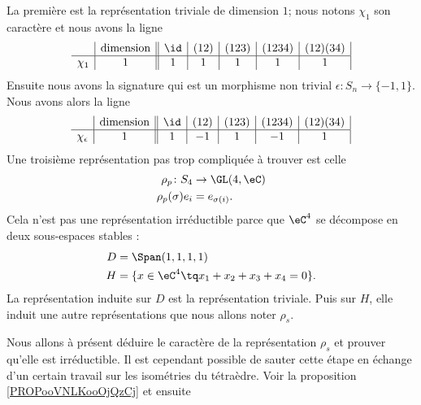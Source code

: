 La première est la représentation triviale de dimension \( 1\); nous notons \( \chi_1\) son caractère et nous avons la ligne
\begin{equation}
    \begin{array}[]{c|c||c|c|c|c|c|}
        &\text{dimension}&\id&(12)&(123)&(1234)&(12)(34)\\
          \hline
          \chi_1&1&1&1&1&1&1\\ 
    \end{array}
\end{equation}
Ensuite nous avons la signature qui est un morphisme non trivial \( \epsilon\colon S_n\to \{ -1,1 \}\). Nous avons alors la ligne
\begin{equation}    \label{EqGNRavtl}
    \begin{array}[]{c|c||c|c|c|c|c|}
        &\text{dimension}&\id&(12)&(123)&(1234)&(12)(34)\\
          \hline
          \chi_{\epsilon}&1&1&-1&1&-1&1\\ 
    \end{array}
\end{equation}
Une troisième représentation pas trop compliquée à trouver est celle 
\begin{equation}
    \begin{aligned}
        \rho_p\colon S_4&\to \GL(4,\eC) \\
        \rho_p(\sigma)e_i&=e_{\sigma(i)}. 
    \end{aligned}
\end{equation}
Cela n'est pas une représentation irréductible parce que \( \eC^4\) se décompose en deux sous-espaces stables :
\begin{subequations}
    \begin{align}
        D&=\Span(1,1,1,1)\\
        H&=\{ x\in\eC^4\tq x_1+x_2+x_3+x_4=0 \}.
    \end{align}
\end{subequations}
La représentation induite sur \( D\) est la représentation triviale. Puis sur \( H\), elle induit une autre représentations que nous allons noter \( \rho_s\). 

Nous allons à présent déduire le caractère de la représentation \( \rho_s\) et prouver qu'elle est irréductible. Il est cependant possible de sauter cette étape en échange d'un certain travail sur les isométries du tétraèdre. Voir la proposition \ref{PROPooVNLKooOjQzCj} et ensuite 

